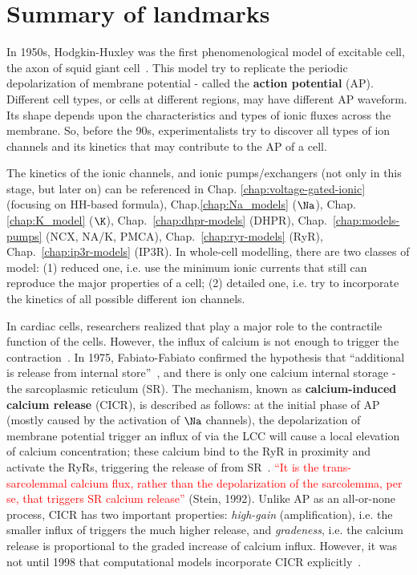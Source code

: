 
\chapter{Summary of landmarks}
\label{chap:summary-landmarks}

In 1950s, Hodgkin-Huxley was the first phenomenological model of excitable cell,
the axon of squid giant cell~\citep{hodgkin1990qdm}. This model try to replicate
the periodic depolarization of membrane potential - called the {\bf action
potential} (AP).  Different cell types, or cells at different regions, may have
different AP waveform.  Its shape depends upon the characteristics and types of
ionic fluxes across the membrane.  So, before the 90s, experimentalists try to
discover all types of ion channels and its kinetics that may contribute to the
AP of a cell. 

The kinetics of the ionic channels, and ionic pumps/exchangers (not only in this
stage, but later on) can be referenced in Chap. \ref{chap:voltage-gated-ionic}
(focusing on HH-based formula), Chap.\ref{chap:Na_models} ($\Na$),
Chap.\ref{chap:K_model} ($\K$), Chap.~\ref{chap:dhpr-models} (DHPR),
Chap.~\ref{chap:models-pumps} (NCX, NA/K, PMCA), Chap.~\ref{chap:ryr-models}
(RyR), Chap.~\ref{chap:ip3r-models} (IP3R). In whole-cell modelling, there are
two classes of model: (1) reduced one, i.e. use the minimum ionic currents that
still can reproduce the major properties of a cell; (2) detailed one, i.e.  try
to incorporate the kinetics of all possible different ion channels.


In cardiac cells, researchers realized that  play a major role to the
contractile function of the cells. However, the influx of calcium is not enough
to trigger the contraction~\citep{bassingthwaighte1972cme}. In 1975,
Fabiato-Fabiato confirmed the hypothesis that ``additional  is release
from internal store''~\citep{fabiato1975cic}, and there is only one calcium
internal storage - the sarcoplasmic reticulum (SR). The mechanism, known as {\bf
calcium-induced calcium release} (CICR), is described as follows: at the initial
phase of AP (mostly caused by the activation of $\Na$ channels), the
depolarization of membrane potential trigger an influx of  via the LCC
will cause a local elevation of calcium concentration; these calcium bind to the
RyR in proximity and activate the RyRs, triggering the release of 
from SR~\citep{fabiato1989apr}. \textcolor{red}{``It is the trans-sarcolemmal
calcium flux, rather than
  the depolarization of the sarcolemma, per se, that triggers SR calcium
  release''}
(Stein, 1992).  Unlike AP as an all-or-none process, CICR has two important
properties: {\it high-gain} (amplification), i.e. the smaller influx of
 triggers the much higher  release, and {\it gradeness},
i.e. the calcium release is proportional to the graded increase of calcium
influx. However, it was not until 1998 that computational models incorporate
CICR explicitly~\citep{jafri1998cad}.


